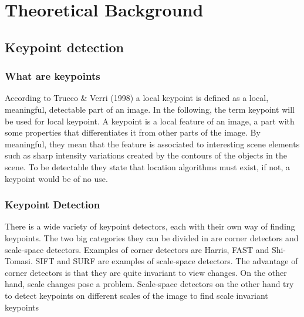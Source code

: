 \chapter{Theoretical Background}


\section{Keypoint detection}

\subsection{What are keypoints}
According to Trucco \& Verri (1998) \cite{book} a local keypoint is defined as a local, meaningful, detectable part of an image. In the following, the term keypoint will be used for local keypoint. A keypoint is a local feature of an image, a part with some properties that differentiates it from other parts of the image. By meaningful, they mean that the feature is associated to interesting scene elements such as sharp intensity variations created by the contours of the objects in the scene. To be detectable they state that location algorithms must exist, if not, a keypoint would be of no use.

\subsection{Keypoint Detection}
There is a wide variety of keypoint detectors, each with their own way of finding keypoints. The two big categories they can be divided in are corner detectors and scale-space detectors. Examples of corner detectors are Harris, FAST and Shi-Tomasi. SIFT and SURF are examples of scale-space detectors. The advantage of corner detectors is that they are quite invariant to view changes. On the other hand, scale changes pose a problem. Scale-space detectors on the other hand try to detect keypoints on different scales of the image to find scale invariant keypoints

